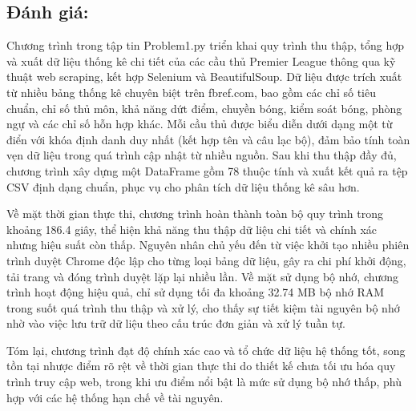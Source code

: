 \documentclass[12pt]{report}
\begin{document}
{\subsection{Đánh giá:}
Chương trình trong tập tin Problem1.py triển khai quy trình thu thập, tổng hợp và xuất dữ liệu thống kê chi tiết của các cầu thủ Premier League thông qua kỹ thuật web scraping, kết hợp Selenium và BeautifulSoup. Dữ liệu được trích xuất từ nhiều bảng thống kê chuyên biệt trên fbref.com, bao gồm các chỉ số tiêu chuẩn, chỉ số thủ môn, khả năng dứt điểm, chuyền bóng, kiểm soát bóng, phòng ngự và các chỉ số hỗn hợp khác. Mỗi cầu thủ được biểu diễn dưới dạng một từ điển với khóa định danh duy nhất (kết hợp tên và câu lạc bộ), đảm bảo tính toàn vẹn dữ liệu trong quá trình cập nhật từ nhiều nguồn. Sau khi thu thập đầy đủ, chương trình xây dựng một DataFrame gồm 78 thuộc tính và xuất kết quả ra tệp CSV định dạng chuẩn, phục vụ cho phân tích dữ liệu thống kê sâu hơn.

Về mặt thời gian thực thi, chương trình hoàn thành toàn bộ quy trình trong khoảng 186.4 giây, thể hiện khả năng thu thập dữ liệu chi tiết và chính xác nhưng hiệu suất còn thấp. Nguyên nhân chủ yếu đến từ việc khởi tạo nhiều phiên trình duyệt Chrome độc lập cho từng loại bảng dữ liệu, gây ra chi phí khởi động, tải trang và đóng trình duyệt lặp lại nhiều lần. Về mặt sử dụng bộ nhớ, chương trình hoạt động hiệu quả, chỉ sử dụng tối đa khoảng 32.74 MB bộ nhớ RAM trong suốt quá trình thu thập và xử lý, cho thấy sự tiết kiệm tài nguyên bộ nhớ nhờ vào việc lưu trữ dữ liệu theo cấu trúc đơn giản và xử lý tuần tự.

Tóm lại, chương trình đạt độ chính xác cao và tổ chức dữ liệu hệ thống tốt, song tồn tại nhược điểm rõ rệt về thời gian thực thi do thiết kế chưa tối ưu hóa quy trình truy cập web, trong khi ưu điểm nổi bật là mức sử dụng bộ nhớ thấp, phù hợp với các hệ thống hạn chế về tài nguyên.
}
\clearpage
\end{document}
